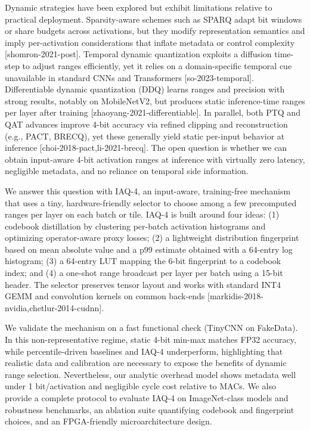\documentclass{article}
\begin{document}
Dynamic strategies have been explored but exhibit limitations relative to practical deployment. Sparsity-aware schemes such as SPARQ adapt bit windows or share budgets across activations, but they modify representation semantics and imply per-activation considerations that inflate metadata or control complexity [shomron-2021-post]. Temporal dynamic quantization exploits a diffusion time-step to adjust ranges efficiently, yet it relies on a domain-specific temporal cue unavailable in standard CNNs and Transformers [so-2023-temporal]. Differentiable dynamic quantization (DDQ) learns ranges and precision with strong results, notably on MobileNetV2, but produces static inference-time ranges per layer after training [zhaoyang-2021-differentiable]. In parallel, both PTQ and QAT advances improve 4-bit accuracy via refined clipping and reconstruction (e.g., PACT, BRECQ), yet these generally yield static per-input behavior at inference [choi-2018-pact,li-2021-brecq]. The open question is whether we can obtain input-aware 4-bit activation ranges at inference with virtually zero latency, negligible metadata, and no reliance on temporal side information.

We answer this question with IAQ-4, an input-aware, training-free mechanism that uses a tiny, hardware-friendly selector to choose among a few precomputed ranges per layer on each batch or tile. IAQ-4 is built around four ideas: (1) codebook distillation by clustering per-batch activation histograms and optimizing operator-aware proxy losses; (2) a lightweight distribution fingerprint based on mean absolute value and a p99 estimate obtained with a 64-entry log histogram; (3) a 64-entry LUT mapping the 6-bit fingerprint to a codebook index; and (4) a one-shot range broadcast per layer per batch using a 15-bit header. The selector preserves tensor layout and works with standard INT4 GEMM and convolution kernels on common back-ends [markidis-2018-nvidia,chetlur-2014-cudnn].

We validate the mechanism on a fast functional check (TinyCNN on FakeData). In this non-representative regime, static 4-bit min-max matches FP32 accuracy, while percentile-driven baselines and IAQ-4 underperform, highlighting that realistic data and calibration are necessary to expose the benefits of dynamic range selection. Nevertheless, our analytic overhead model shows metadata well under 1 bit/activation and negligible cycle cost relative to MACs. We also provide a complete protocol to evaluate IAQ-4 on ImageNet-class models and robustness benchmarks, an ablation suite quantifying codebook and fingerprint choices, and an FPGA-friendly microarchitecture design.
\end{document}
